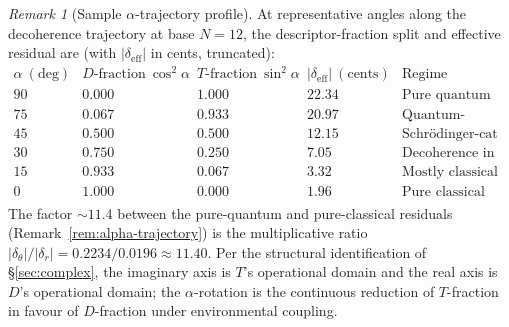 \documentclass[11pt,a4paper]{article}
\theoremstyle{definition}
\theoremstyle{remark}
\newtheorem{remark}[theorem]{Remark}
\begin{document}
\begin{remark}[Sample $\alpha$-trajectory profile]\label{rem:alpha-profile}
At representative angles along the decoherence trajectory at base $N=12$, the descriptor-fraction split and effective residual are (with $|\delta_{\mathrm{eff}}|$ in cents, truncated):
\[
\begin{array}{c|c|c|c|l}
\alpha~(\text{deg}) & D\text{-fraction}~\cos^{2}\alpha & T\text{-fraction}~\sin^{2}\alpha & |\delta_{\mathrm{eff}}|~(\text{cents}) & \text{Regime} \\ \hline
90 & 0.000 & 1.000 & 22.34 & \text{Pure quantum (imaginary-axis dominance)} \\
75 & 0.067 & 0.933 & 20.97 & \text{Quantum-dominated} \\
45 & 0.500 & 0.500 & 12.15 & \text{Schr\"odinger-cat regime} \\
30 & 0.750 & 0.250 & 7.05 & \text{Decoherence in progress} \\
15 & 0.933 & 0.067 & 3.32 & \text{Mostly classical} \\
 0 & 1.000 & 0.000 & 1.96 & \text{Pure classical (real-axis dominance)}
\end{array}
\]
The factor $\sim 11.4$ between the pure-quantum and pure-classical residuals (Remark~\ref{rem:alpha-trajectory}) is the multiplicative ratio $|\delta_{\theta}|/|\delta_{r}| = 0.2234/0.0196 \approx 11.40$. Per the structural identification of \S\ref{sec:complex}, the imaginary axis is $T$'s operational domain and the real axis is $D$'s operational domain; the $\alpha$-rotation is the continuous reduction of $T$-fraction in favour of $D$-fraction under environmental coupling.
\end{remark}
\end{document}
